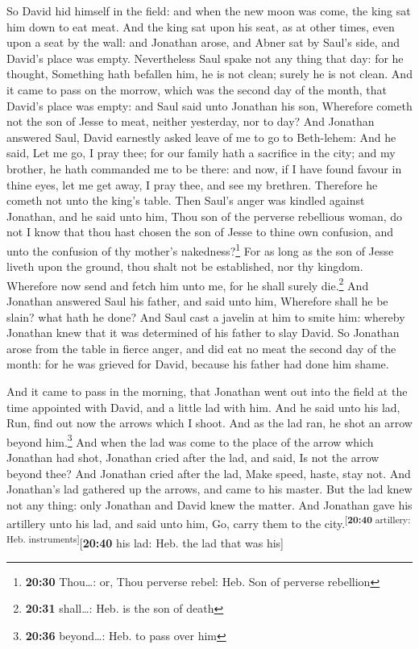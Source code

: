  So David hid himself in the field: and when the new moon
was come, the king sat him down to eat meat.  And the
king sat upon his seat, as at other times, even upon a seat by the wall:
and Jonathan arose, and Abner sat by Saul's side, and David's place was
empty.  Nevertheless Saul spake not any thing that day:
for he thought, Something hath befallen him, he is not clean; surely he
is not clean.  And it came to pass on the morrow, which
was the second day of the month, that David's place was empty: and Saul
said unto Jonathan his son, Wherefore cometh not the son of Jesse to
meat, neither yesterday, nor to day?  And Jonathan
answered Saul, David earnestly asked leave of me to go to Beth-lehem:
 And he said, Let me go, I pray thee; for our family hath
a sacrifice in the city; and my brother, he hath commanded me to be
there: and now, if I have found favour in thine eyes, let me get away, I
pray thee, and see my brethren. Therefore he cometh not unto the king's
table.  Then Saul's anger was kindled against Jonathan,
and he said unto him, Thou son of the perverse rebellious woman, do not
I know that thou hast chosen the son of Jesse to thine own confusion,
and unto the confusion of thy mother's nakedness?\footnote{\textbf{20:30}
  Thou\ldots: or, Thou perverse rebel: Heb. Son of perverse rebellion}
 For as long as the son of Jesse liveth upon the ground,
thou shalt not be established, nor thy kingdom. Wherefore now send and
fetch him unto me, for he shall surely die.\footnote{\textbf{20:31}
  shall\ldots: Heb. is the son of death}  And Jonathan
answered Saul his father, and said unto him, Wherefore shall he be
slain? what hath he done?  And Saul cast a javelin at him
to smite him: whereby Jonathan knew that it was determined of his father
to slay David.  So Jonathan arose from the table in
fierce anger, and did eat no meat the second day of the month: for he
was grieved for David, because his father had done him shame.

 And it came to pass in the morning, that Jonathan went
out into the field at the time appointed with David, and a little lad
with him.  And he said unto his lad, Run, find out now
the arrows which I shoot. And as the lad ran, he shot an arrow beyond
him.\footnote{\textbf{20:36} beyond\ldots: Heb. to pass over him}
 And when the lad was come to the place of the arrow
which Jonathan had shot, Jonathan cried after the lad, and said, Is not
the arrow beyond thee?  And Jonathan cried after the lad,
Make speed, haste, stay not. And Jonathan's lad gathered up the arrows,
and came to his master.  But the lad knew not any thing:
only Jonathan and David knew the matter.  And Jonathan
gave his artillery unto his lad, and said unto him, Go, carry them to
the city.\textsuperscript{{[}\textbf{20:40} artillery: Heb.
instruments{]}}{[}\textbf{20:40} his lad: Heb. the lad that was his{]}

